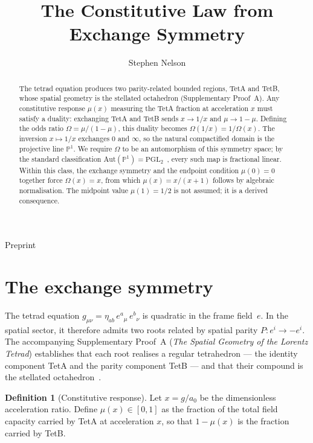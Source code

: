 \documentclass[twocolumn]{iopjournal}
\renewcommand{\articletype}[1]{%
  {\vspace*{-8mm}\noindent \Large \sf Preprint}\par
  \vspace*{6mm}\noindent{\scriptsize \sf{\bfseries \MakeUppercase{#1}}}}
\theoremstyle{definition}
\newtheorem{definition}[lemma]{Definition}
\begin{document}
\articletype{Supplementary Material}

\title{The Constitutive Law from Exchange Symmetry}

\author{Stephen Nelson}



\begin{abstract}
The tetrad equation produces two parity-related bounded regions,
TetA and TetB, whose spatial geometry is the stellated
octahedron (Supplementary Proof~A).  Any constitutive response
$\mu(x)$ measuring the TetA fraction at acceleration $x$ must
satisfy a duality: exchanging TetA and TetB sends $x \to 1/x$
and $\mu \to 1 - \mu$.  Defining the odds ratio
$\Omega = \mu/(1 - \mu)$, this duality becomes
$\Omega(1/x) = 1/\Omega(x)$.  The inversion $x \mapsto 1/x$
exchanges $0$ and $\infty$, so the natural compactified domain
is the projective line $\mathbb{P}^1$.  We require $\Omega$ to
be an automorphism of this symmetry space; by the standard
classification $\mathrm{Aut}(\mathbb{P}^1) =
\mathrm{PGL}_2$~\cite{Hartshorne1977}, every such map is
fractional linear.  Within this class, the exchange symmetry
and the endpoint condition $\mu(0) = 0$ together force
$\Omega(x) = x$, from which $\mu(x) = x/(x+1)$ follows by
algebraic normalisation.  The midpoint value $\mu(1) = 1/2$ is
not assumed; it is a derived consequence.
\end{abstract}


\section*{The exchange symmetry}

The tetrad equation
$g_{\mu\nu} = \eta_{ab}\, e^a{}_\mu\, e^b{}_\nu$ is quadratic
in the frame field~$e$.  In the spatial sector, it therefore
admits two roots related by spatial parity
$P: e^i \to -e^i$.  The accompanying Supplementary Proof~A
(\textit{The Spatial Geometry of the Lorentz Tetrad})
establishes that each root realises a regular tetrahedron ---
the identity component TetA and the parity component TetB ---
and that their compound is the stellated
octahedron~\cite{Kepler1619}.

\begin{definition}[Constitutive response]
\label{def:response}
Let $x = g/a_0$ be the dimensionless acceleration ratio.
Define $\mu(x) \in [0,1]$ as the fraction of the total field
capacity carried by TetA at acceleration $x$, so that
$1 - \mu(x)$ is the fraction carried by TetB.
\end{definition}
\end{document}
